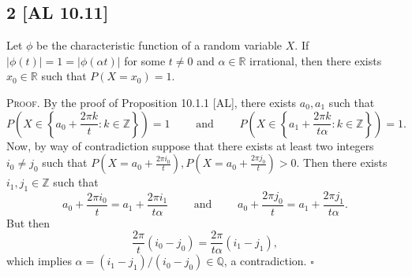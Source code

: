 \documentclass[12pt]{article}
\newcounter{ProofCounter}
\newenvironment{Proof}{\stepcounter{ProofCounter}\textsc{Proof.}}{\hfill$\square$}
\begin{document}
\subsection*{2 [AL 10.11]}
\begin{tcolorbox}
  Let $\phi$ be the characteristic function of a random variable $X$. If $|\phi(t)| = 1 = |\phi(\alpha t)|$ for some $t \neq 0$ and $\alpha \in
  \mathbb{R}$ irrational, then there exists $x_0 \in \mathbb{R}$ such that $P(X = x_0) = 1$.
\end{tcolorbox}
\begin{Proof}
  By the proof of Proposition 10.1.1 [AL], there exists $a_0, a_1$ such that 
  \[ 
    P(X \in \left\{ a_0 + \frac{2\pi k}{t} : k \in \mathbb{Z} \right\}) = 1 \qquad \text{ and } \qquad P(X \in \left\{ a_1 + \frac{2\pi k}{t\alpha} :
    k \in \mathbb{Z}\right\}) = 1. 
  \]
  Now, by way of contradiction suppose that there exists at least two integers $i_0 \neq j_0$ such that $P(X = a_0 + \frac{2\pi i_0}{t}), P(X = a_0 +
  \frac{2\pi j_0}{t}) > 0$. Then there exists $i_1, j_1 \in \mathbb{Z}$ such that 
  \[
    a_0 + \frac{2\pi i_0}{t} = a_1 + \frac{2\pi i_1}{t\alpha} \qquad \text{ and } \qquad a_0 + \frac{2\pi j_0}{t} = a_1 + \frac{2\pi j_1}{t\alpha}.
  \]
  But then 
  \[ 
    \frac{2\pi}{t}(i_0 - j_0) = \frac{2\pi}{t\alpha}(i_1 - j_1), 
  \]
  which implies $\alpha = (i_1 - j_1) / (i_0 - j_0) \in \mathbb{Q}$, a contradiction.
\end{Proof}



\newpage 
\end{document}
